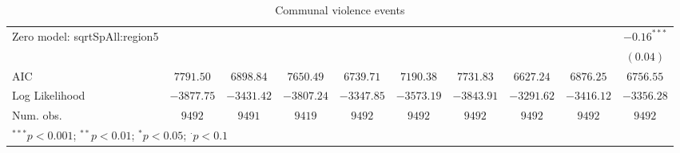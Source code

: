 \begin{table}
\begin{center}
{\begin{tabular}{l c c c c c c c c c}
Zero model: sqrtSpAll:region5  &               &               &               &               &                 &                 &               &                & $-0.16^{***}$ \\
                               &               &               &               &               &                 &                 &               &                & $(0.04)$      \\
\midrule
AIC                            & $7791.50$     & $6898.84$     & $7650.49$     & $6739.71$     & $7190.38$       & $7731.83$       & $6627.24$     & $6876.25$      & $6756.55$     \\
Log Likelihood                 & $-3877.75$    & $-3431.42$    & $-3807.24$    & $-3347.85$    & $-3573.19$      & $-3843.91$      & $-3291.62$    & $-3416.12$     & $-3356.28$    \\
Num. obs.                      & $9492$        & $9491$        & $9419$        & $9492$        & $9492$          & $9492$          & $9492$        & $9492$         & $9492$        \\
\bottomrule
\multicolumn{10}{l}{\scriptsize{$^{***}p<0.001$; $^{**}p<0.01$; $^{*}p<0.05$; $^{\cdot}p<0.1$}}
\end{tabular}
}
\caption{Communal violence events}
\label{zorg3}
\end{center}
\end{table}
